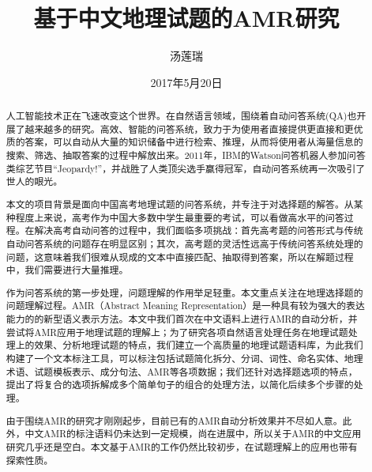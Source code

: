 \documentclass[master, winfont]{njuthesis}
\title{基于中文地理试题的AMR研究}
\author{汤莲瑞}
\institute{南京大学}
\date{2017年5月20日}
\begin{document}

\maketitle
\makeenglishtitle


\frontmatter

\begin{abstract}
人工智能技术正在飞速改变这个世界。在自然语言领域，围绕着自动问答系统(QA)也开展了越来越多的研究。高效、智能的问答系统，致力于为使用者直接提供更直接和更优质的答案，可以自动从大量的知识储备中进行检索、推理，从而将使用者从海量信息的搜索、筛选、抽取答案的过程中解放出来。2011年，IBM的Watson问答机器人参加问答类综艺节目“Jeopardy!”，并战胜了人类顶尖选手赢得冠军，自动问答系统再一次吸引了世人的眼光。

本文的项目背景是面向中国高考地理试题的问答系统，并专注于对选择题的解答。从某种程度上来说，高考作为中国大多数中学生最重要的考试，可以看做高水平的问答过程。在解决高考自动问答的过程中，我们面临多项挑战：首先高考题的问答形式与传统自动问答系统的问题存在明显区别；其次，高考题的灵活性远高于传统问答系统处理的问题，这意味着我们很难从现成的文本中直接匹配、抽取得到答案，所以在解题过程中，我们需要进行大量推理。

作为问答系统的第一步处理，问题理解的作用举足轻重。本文重点关注在地理选择题的问题理解过程。AMR（Abstract Meaning Representation）是一种具有较为强大的表达能力的的新型语义表示方法。本文中我们首次在中文语料上进行AMR的自动分析，并尝试将AMR应用于地理试题的理解上；为了研究各项自然语言处理任务在地理试题处理上的效果、分析地理试题的特点，我们建立一个高质量的地理试题语料库，为此我们构建了一个文本标注工具，可以标注包括试题简化拆分、分词、词性、命名实体、地理术语、试题模板表示、成分句法、AMR等各项数据；我们还针对选择题选项的特点，提出了将复合的选项拆解成多个简单句子的组合的处理方法，以简化后续多个步骤的处理。

由于围绕AMR的研究才刚刚起步，目前已有的AMR自动分析效果并不尽如人意。此外，中文AMR的标注语料仍未达到一定规模，尚在进展中，所以关于AMR的中文应用研究几乎还是空白。本文基于AMR的工作仍然比较初步，在试题理解上的应用也带有探索性质。

\end{abstract}
\end{document}
